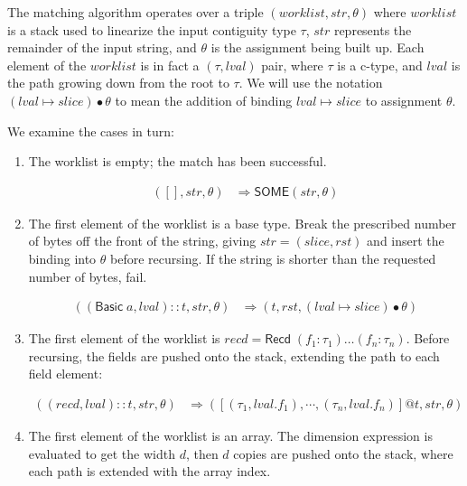 \documentclass[svgnames]{llncs}
\newcommand{\konst}[1]{\ensuremath{\mathsf{#1}}}
\newcommand{\lval}{\ensuremath{\mathit{lval}}}
\begin{document}
\begin{definition}

The matching algorithm operates over a triple $(\mathit{worklist},
\mathit{str}, \theta)$ where $\mathit{worklist}$ is a stack used to
linearize the input contiguity type $\tau$, $\mathit{str}$
represents the remainder of the input string, and $\theta$ is the
assignment being built up. Each element of the $\mathit{worklist}$ is
in fact a $(\tau,\mathit{lval})$ pair, where $\tau$ is a c-type, and
$\mathit{lval}$ is the path growing down from the root to $\tau$. We
will use the notation $(\lval \mapsto \mathit{slice}) \bullet \theta$
to mean the addition of binding $\lval \mapsto \mathit{slice}$ to
assignment $\theta$.

We examine the cases in turn:

\begin{enumerate}

\item The worklist is empty; the match has been successful.

\begin{align*}
([], \mathit{str}, \theta) &\Rightarrow \konst{SOME}(\mathit{str}, \theta)
\end{align*}


\item The first element of the worklist is a base type. Break the
  prescribed number of bytes off the front of the string, giving
  $\mathit{str} = (\mathit{slice},\mathit{rst})$ and insert the
  binding into $\theta$ before recursing. If the string is shorter
  than the requested number of bytes, fail.

\begin{align*}
((\konst{Basic}\;a, \lval)::t, \mathit{str}, \theta)
   &\Rightarrow
  (t,\mathit{rst}, (\lval \mapsto \mathit{slice}) \bullet \theta)
\end{align*}

\item The first element of the worklist is $\mathit{recd} =
  \konst{Recd}\;(f_1 : \tau_1) \ldots (f_n : \tau_n)$. Before
  recursing, the fields are pushed onto the stack, extending the path
  to each field element:

\begin{align*}
((\mathit{recd}, \lval)::t, \mathit{str}, \theta)
   &\Rightarrow
  ([(\tau_1,\lval.f_1), \cdots , (\tau_n,\lval.f_n)] @ t,\mathit{str}, \theta)
\end{align*}


\item The first element of the worklist is an array. The dimension
  expression is evaluated to get the width $d$, then $d$ copies are
  pushed onto the stack, where each path is extended with the array
  index.


\end{enumerate}
\end{definition}
\end{document}
